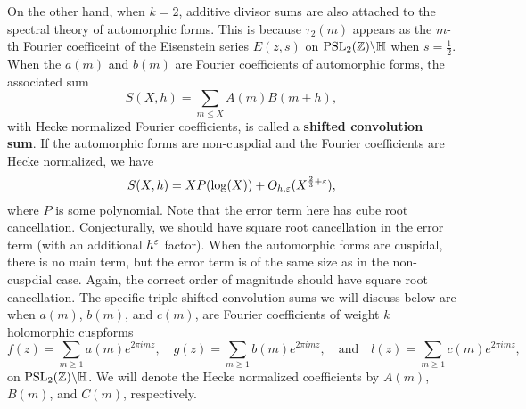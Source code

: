 \documentclass[12pt,reqno,oneside]{amsart}
\begin{document}
  On the other hand, when $k = 2$, additive divisor sums are also attached to the spectral theory of automorphic forms. This is because $\tau_{2}(m)$ appears as the $m$-th Fourier coefficeint of the Eisenstein series $E(z,s)$ on $\mathrm{PSL}_{2}(\mathbb{Z})\backslash\mathbb{H}$ when $s = \frac{1}{2}$. When the $a(m)$ and $b(m)$ are Fourier coefficients of automorphic forms, the associated sum
  \[
    S(X,h) = \sum_{m \le X}A(m)B(m+h),
  \]
  with Hecke normalized Fourier coefficients, is called a \textbf{shifted convolution sum}. If the automorphic forms are non-cuspdial and the Fourier coefficients are Hecke normalized, we have
  \[
    S(X,h) = XP(\log(X))+O_{h,\varepsilon}(X^{\frac{2}{3}+\varepsilon}),
  \]
  where $P$ is some polynomial. Note that the error term here has cube root cancellation. Conjecturally, we should have square root cancellation in the error term (with an additional $h^{\varepsilon}$ factor). When the automorphic forms are cuspidal, there is no main term, but the error term is of the same size as in the non-cuspdial case. Again, the correct order of magnitude should have square root cancellation. The specific triple shifted convolution sums we will discuss below are when $a(m)$, $b(m)$, and $c(m)$, are Fourier coefficients of weight $k$ holomorphic cuspforms
  \[
    f(z) = \sum_{m \ge 1}a(m)e^{2\pi imz}, \quad g(z) = \sum_{m \ge 1}b(m)e^{2\pi imz}, \quad \text{and} \quad l(z) = \sum_{m \ge 1}c(m)e^{2\pi imz},
  \]
  on $\mathrm{PSL}_{2}(\mathbb{Z})\backslash\mathbb{H}$. We will denote the Hecke normalized coefficients by $A(m)$, $B(m)$, and $C(m)$, respectively.
\end{document}
